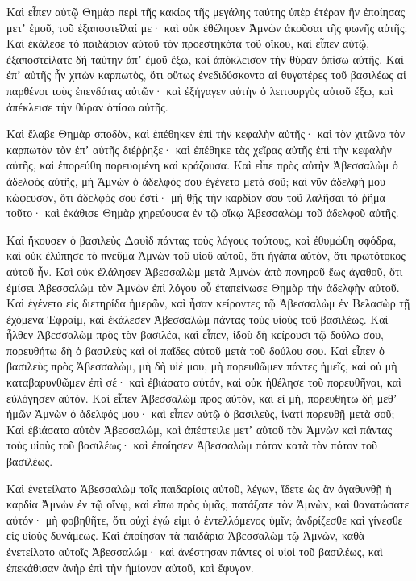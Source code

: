 {Καὶ εἶπεν αὐτῷ Θημὰρ περὶ τῆς κακίας τῆς μεγάλης ταύτης ὑπὲρ ἑτέραν ἣν ἐποίησας μετʼ ἐμοῦ, τοῦ ἐξαποστεῖλαί με· καὶ οὐκ ἐθέλησεν Ἀμνὼν ἀκοῦσαι τῆς φωνῆς αὐτῆς.
Καὶ ἐκάλεσε τὸ παιδάριον αὐτοῦ τὸν προεστηκότα τοῦ οἴκου, καὶ εἶπεν αὐτῷ, ἐξαποστείλατε δὴ ταύτην ἀπʼ ἐμοῦ ἔξω, καὶ ἀπόκλεισον τὴν θύραν ὀπίσω αὐτῆς.
Καὶ ἐπʼ αὐτῆς ἦν χιτὼν καρπωτὸς, ὅτι οὕτως ἐνεδιδύσκοντο αἱ θυγατέρες τοῦ βασιλέως αἱ παρθένοι τοὺς ἐπενδύτας αὐτῶν· καὶ ἐξήγαγεν αὐτὴν ὁ λειτουργὸς αὐτοῦ ἔξω, καὶ ἀπέκλεισε τὴν θύραν ὀπίσω αὐτῆς.
\par }{\PP {}Καὶ ἔλαβε Θημὰρ σποδὸν, καὶ ἐπέθηκεν ἐπὶ τὴν κεφαλὴν αὐτῆς· καὶ τὸν χιτῶνα τὸν καρπωτὸν τὸν ἐπʼ αὐτῆς διέῤῥηξε· καὶ ἐπέθηκε τὰς χεῖρας αὐτῆς ἐπὶ τὴν κεφαλὴν αὐτῆς, καὶ ἐπορεύθη πορευομένη καὶ κράζουσα.
Καὶ εἶπε πρὸς αὐτὴν Ἀβεσσαλὼμ ὁ ἀδελφὸς αὐτῆς, μὴ Ἀμνὼν ὁ ἀδελφός σου ἐγένετο μετὰ σοῦ; καὶ νῦν ἀδελφή μου κώφευσον, ὅτι ἀδελφός σου ἐστί· μὴ θῇς τὴν καρδίαν σου τοῦ λαλῆσαι τὸ ῥῆμα τοῦτο· καὶ ἐκάθισε Θημὰρ χηρεύουσα ἐν τῷ οἴκῳ Ἀβεσσαλὼμ τοῦ ἀδελφοῦ αὐτῆς.
\par }{\PP {}Καὶ ἤκουσεν ὁ βασιλεὺς Δαυὶδ πάντας τοὺς λόγους τούτους, καὶ ἐθυμώθη σφόδρα, καὶ οὐκ ἐλύπησε τὸ πνεῦμα Ἀμνὼν τοῦ υἱοῦ αὐτοῦ, ὅτι ἠγάπα αὐτὸν, ὅτι πρωτότοκος αὐτοῦ ἦν.
Καὶ οὐκ ἐλάλησεν Ἀβεσσαλὼμ μετὰ Ἀμνὼν ἀπὸ πονηροῦ ἕως ἀγαθοῦ, ὅτι ἐμίσει Ἀβεσσαλὼμ τὸν Ἀμνὼν ἐπὶ λόγου οὗ ἐταπείνωσε Θημὰρ τὴν ἀδελφὴν αὐτοῦ.
Καὶ ἐγένετο εἰς διετηρίδα ἡμερῶν, καὶ ἦσαν κείροντες τῷ Ἀβεσσαλὼμ ἐν Βελασὼρ τῇ ἐχόμενα Ἐφραὶμ, καὶ ἐκάλεσεν Ἀβεσσαλὼμ πάντας τοὺς υἱοὺς τοῦ βασιλέως.
Καὶ ἦλθεν Ἀβεσσαλὼμ πρὸς τὸν βασιλέα, καὶ εἶπεν, ἰδοὺ δὴ κείρουσι τῷ δούλῳ σου, πορευθήτω δὴ ὁ βασιλεὺς καὶ οἱ παῖδες αὐτοῦ μετὰ τοῦ δούλου σου.
Καὶ εἶπεν ὁ βασιλεὺς πρὸς Ἀβεσσαλὼμ, μὴ δὴ υἱέ μου, μὴ πορευθῶμεν πάντες ἡμεῖς, καὶ οὐ μὴ καταβαρυνθῶμεν ἐπὶ σέ· καὶ ἐβιάσατο αὐτόν, καὶ οὐκ ἠθέλησε τοῦ πορευθῆναι, καὶ εὐλόγησεν αὐτόν.
Καὶ εἶπεν Ἀβεσσαλὼμ πρὸς αὐτὸν, καὶ εἰ μή, πορευθήτω δὴ μεθʼ ἡμῶν Ἀμνὼν ὁ ἀδελφός μου· καὶ εἶπεν αὐτῷ ὁ βασιλεὺς, ἱνατί πορευθῇ μετὰ σοῦ;
Καὶ ἐβιάσατο αὐτὸν Ἀβεσσαλώμ, καὶ ἀπέστειλε μετʼ αὐτοῦ τὸν Ἀμνὼν καὶ πάντας τοὺς υἱοὺς τοῦ βασιλέως· καὶ ἐποίησεν Ἀβεσσαλὼμ πότον κατὰ τὸν πότον τοῦ βασιλέως.
\par }{\PP {}Καὶ ἐνετείλατο Ἀβεσσαλὼμ τοῖς παιδαρίοις αὐτοῦ, λέγων, ἴδετε ὡς ἂν ἀγαθυνθῇ ἡ καρδία Ἀμνὼν ἐν τῷ οἴνῳ, καὶ εἴπω πρὸς ὑμᾶς, πατάξατε τὸν Ἀμνὼν, καὶ θανατώσατε αὐτόν· μὴ φοβηθῆτε, ὅτι οὐχὶ ἐγώ εἰμι ὁ ἐντελλόμενος ὑμῖν; ἀνδρίζεσθε καὶ γίνεσθε εἰς υἱοὺς δυνάμεως.
Καὶ ἐποίησαν τὰ παιδάρια Ἀβεσσαλὼμ τῷ Ἀμνὼν, καθὰ ἐνετείλατο αὐτοῖς Ἀβεσσαλώμ· καὶ ἀνέστησαν πάντες οἱ υἱοὶ τοῦ βασιλέως, καὶ ἐπεκάθισαν ἀνὴρ ἐπὶ τὴν ἡμίονον αὐτοῦ, καὶ ἔφυγον.
}
